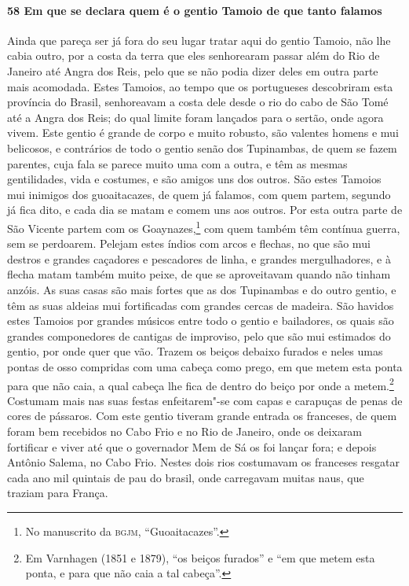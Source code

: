 \begin{linenumbers}
\paragraph{58 Em que se declara quem é o gentio Tamoio de que tanto falamos} \quad
Ainda que pareça ser já fora do seu lugar tratar aqui do gentio Tamoio, não lhe cabia
outro, por a costa da terra que eles senhorearam passar além do Rio de Janeiro até Angra
dos Reis, pelo que se não podia dizer deles em outra parte mais acomodada. Estes Tamoios,
ao tempo que os portugueses descobriram esta província do Brasil, senhoreavam a costa dele
desde o rio do cabo de São Tomé até a Angra dos Reis; do qual limite foram lançados para o
sertão, onde agora vivem. Este gentio é grande de corpo e muito robusto, são valentes
homens e mui belicosos, e contrários de todo o gentio senão dos Tupinambas, de quem se
fazem parentes, cuja fala se parece muito uma com a outra, e têm as mesmas gentilidades,
vida e costumes, e são amigos uns dos outros. São estes Tamoios mui inimigos dos
guoaitacazes, de quem já falamos, com quem partem, segundo já fica dito, e cada dia se
matam e comem uns aos outros. Por esta outra parte de São Vicente partem com os
Goaynazes,\footnote{ No manuscrito da \textsc{bgjm}, ``Guoaitacazes''.} com quem também
têm contínua guerra, sem se perdoarem. Pelejam estes índios com arcos e flechas, no que
são mui destros e grandes caçadores e pescadores de linha, e grandes mergulhadores, e à
flecha matam também muito peixe, de que se aproveitavam quando não tinham anzóis. As suas
casas são mais fortes que as dos Tupinambas e do outro gentio, e têm as suas aldeias mui
fortificadas com grandes cercas de madeira. São havidos estes Tamoios por grandes músicos
entre todo o gentio e bailadores, os quais são grandes componedores de cantigas de
improviso, pelo que são mui estimados do gentio, por onde quer que vão. Trazem os beiços
debaixo furados e neles umas pontas de osso compridas com uma cabeça como prego, em que
metem esta ponta para que não caia, a qual cabeça lhe fica de dentro do beiço por onde a
metem.\footnote{ Em Varnhagen (1851 e 1879), ``os beiços furados'' e ``em que metem esta
ponta, e para que não caia a tal cabeça''.} Costumam mais nas suas festas enfeitarem"-se
com capas e carapuças de penas de cores de pássaros. Com este gentio tiveram grande
entrada os franceses, de quem foram bem recebidos no Cabo Frio e no Rio de Janeiro, onde
os deixaram fortificar e viver até que o governador Mem de Sá os foi lançar fora; e depois
Antônio Salema, no Cabo Frio. Nestes dois rios costumavam os franceses resgatar cada ano
mil quintais de pau do brasil, onde carregavam muitas naus, que traziam para França.


\end{linenumbers}

